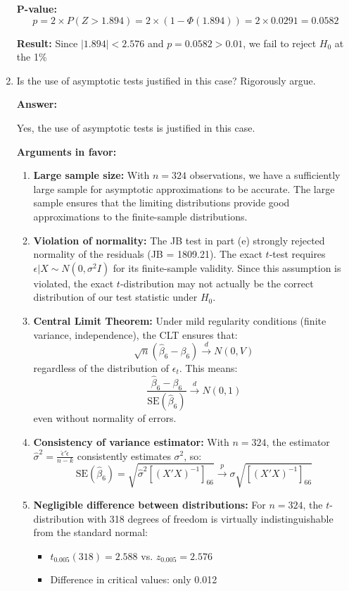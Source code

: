 \documentclass[12pt,a4paper]{article}
\begin{document}
\begin{enumerate}[label=(\alph*)]
\textbf{P-value:} 
$$p = 2 \times P(Z > 1.894) = 2 \times (1 - \Phi(1.894)) 
= 2 \times 0.0291 = 0.0582$$

\textbf{Result:} Since $|1.894| < 2.576$ and 
$p = 0.0582 > 0.01$, we fail to reject $H_0$ at the 1\% 
  
  \item Is the use of asymptotic tests justified in this case? Rigorously argue.
  
  \textbf{Answer:} 

  Yes, the use of asymptotic tests is justified in this case.

\textbf{Arguments in favor:}

\begin{enumerate}
\item \textbf{Large sample size:} With $n = 324$ observations, 
we have a sufficiently large sample for asymptotic approximations 
to be accurate. The large sample ensures that the limiting 
distributions provide good approximations to the finite-sample 
distributions.

\item \textbf{Violation of normality:} The JB test in part (e) 
strongly rejected normality of the residuals (JB = 1809.21). 
The exact $t$-test requires $\epsilon | X \sim N(0, \sigma^2 I)$ 
for its finite-sample validity. Since this assumption is violated, 
the exact $t$-distribution may not actually be the correct 
distribution of our test statistic under $H_0$.

\item \textbf{Central Limit Theorem:} Under mild regularity 
conditions (finite variance, independence), the CLT ensures that:
$$\sqrt{n}(\hat{\beta}_6 - \beta_6) \xrightarrow{d} N(0, V)$$
regardless of the distribution of $\epsilon_t$. This means:
$$\frac{\hat{\beta}_6 - \beta_6}{\text{SE}(\hat{\beta}_6)} 
\xrightarrow{d} N(0,1)$$
even without normality of errors.

\item \textbf{Consistency of variance estimator:} With $n = 324$, 
the estimator $\hat{\sigma}^2 = \frac{\hat{\epsilon}'\hat{\epsilon}}{n-k}$ 
consistently estimates $\sigma^2$, so:
$$\text{SE}(\hat{\beta}_6) = 
\sqrt{\hat{\sigma}^2[(X'X)^{-1}]_{66}} 
\xrightarrow{p} \sigma\sqrt{[(X'X)^{-1}]_{66}}$$

\item \textbf{Negligible difference between distributions:} 
For $n = 324$, the $t$-distribution with 318 degrees of freedom 
is virtually indistinguishable from the standard normal:
\begin{itemize}
\item $t_{0.005}(318) = 2.588$ vs. $z_{0.005} = 2.576$
\item Difference in critical values: only 0.012
\end{itemize}


\end{enumerate}
\end{enumerate}
\end{document}
